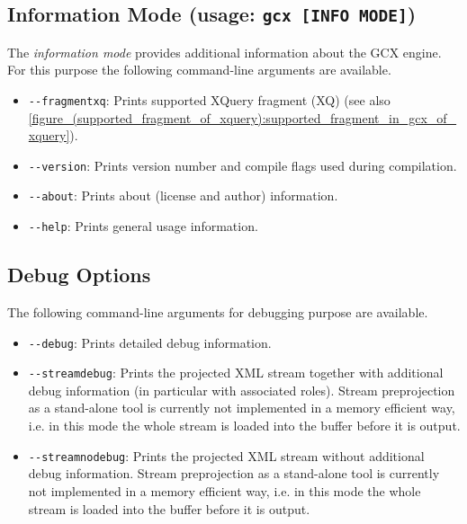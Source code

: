 \subsection{Information Mode (usage: \texttt{gcx [INFO MODE]})}
The \emph{information mode} provides additional information about the GCX engine. For this purpose the following command-line arguments are available.
\begin{itemize}
  \setlength{\itemsep}{0pt}
  \item[] \texttt{{-}{-}fragmentxq}: Prints supported XQuery fragment (XQ) (see also \autoref{figure_(supported_fragment_of_xquery):supported_fragment_in_gcx_of_xquery}).
  \item[] \texttt{{-}{-}version}: Prints version number and compile flags used during compilation.
  \item[] \texttt{{-}{-}about}: Prints about (license and author) information.
  \item[] \texttt{{-}{-}help}: Prints general usage information.
\end{itemize}

\subsection{Debug Options}
\label{subsection_(command_line_arguments):debug_options}
The following command-line arguments for debugging purpose are available.
\begin{itemize}
  \item[] \texttt{{-}{-}debug}: Prints detailed debug information.
  \item[] \texttt{{-}{-}streamdebug}: Prints the projected XML stream together with additional debug information (in particular with associated roles). Stream preprojection as a stand-alone tool is currently not implemented in a memory efficient way, i.e. in this mode the whole stream is loaded into the buffer before it is output.
  \item[] \texttt{{-}{-}streamnodebug}: Prints the projected XML stream without additional debug information. Stream preprojection as a stand-alone tool is currently not implemented in a memory efficient way, i.e. in this mode the whole stream is loaded into the buffer before it is output.
\end{itemize} 
